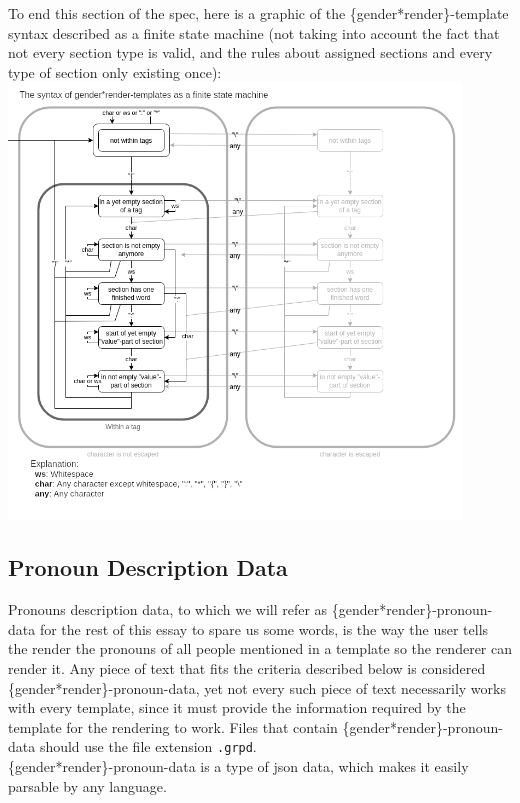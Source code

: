 \documentclass{article}
\begin{document}
    To end this section of the spec, here is a graphic of the \{gender*render\}-template syntax described as a finite state machine (not taking into account the fact that not every section type is valid, and the rules about assigned sections and every type of section only existing once):\\

    \includegraphics[width=12cm]{images/template-as-finite-state-machine.png}

    \subsection{Pronoun Description Data}

     Pronouns description data, to which we will refer as \{gender*render\}-pronoun-data for the rest of this essay to spare us some words, is the way the user tells the render the pronouns of all people mentioned in a template so the renderer can render it.
     Any piece of text that fits the criteria described below is considered \{gender*render\}-pronoun-data, yet not every such piece of text necessarily works with every template, since it must provide the information required by the template for the rendering to work.
    Files that contain \{gender*render\}-pronoun-data should use the file extension \texttt{.grpd}.\\

    \{gender*render\}-pronoun-data is a type of json data, which makes it easily parsable by any language.\\
\end{document}

